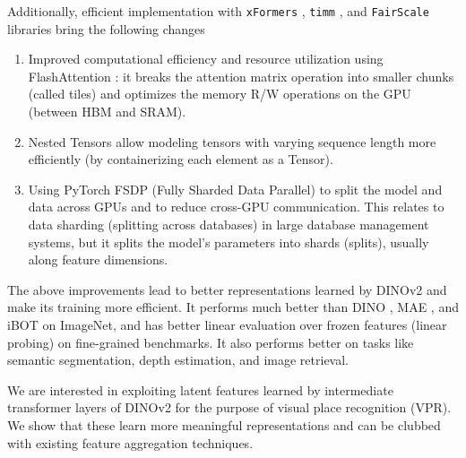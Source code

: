 Additionally, efficient implementation with \texttt{xFormers}
\cite{Lefaudeux2022xFormersAM}, \texttt{timm}
\cite{Wightman2019PyTorchIM}, and \texttt{FairScale}
\cite{FairScale2021} libraries bring the following changes

\begin{enumerate}
    \item Improved computational efficiency and resource utilization
        using FlashAttention \cite{Dao2022FlashAttentionFA}: it breaks
        the attention matrix operation into smaller chunks (called
        tiles) and optimizes the memory R/W operations on the GPU
        (between HBM and SRAM).
    \item Nested Tensors allow modeling tensors with varying sequence
        length more efficiently (by containerizing each element as a
        Tensor).
    \item Using PyTorch FSDP (Fully Sharded Data Parallel)
        \cite{Zhao2023PyTorchFE} to split the model and data across
        GPUs and to reduce cross-GPU communication. This relates to
        data sharding (splitting across databases) in large database
        management systems, but it splits the model's parameters into
        shards (splits), usually along feature dimensions.
\end{enumerate}

The above improvements lead to better representations learned by
DINOv2 and make its training more efficient. It performs much better
than DINO \cite{Caron2021EmergingPI}, MAE \cite{He2021MaskedAA}, and
iBOT \cite{Zhou2021iBOTIB} on ImageNet, and has better linear
evaluation over frozen features (linear probing) on fine-grained
benchmarks. It also performs better on tasks like semantic
segmentation, depth estimation, and image retrieval.

We are interested in exploiting latent features learned by
intermediate transformer layers of DINOv2 for the purpose of visual
place recognition (VPR). We show that these learn more meaningful
representations and can be clubbed with existing feature aggregation
techniques.
